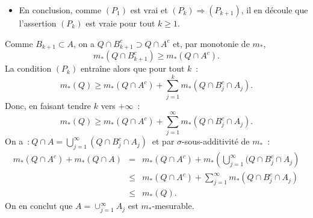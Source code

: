 {\begin{enumerate}
{\begin{itemize}
Supposons que l'assertion $(P_{k})$ soit v\'erifi\'ee, alors
$$
m_*(Q) = m_*(Q \cap B_{k+1}^c) + \sum _{j=1}^{k} m_*(Q \cap
B_{j}^c \cap A_j),
$$
et d'apr\`es \eqref{la}
\begin{eqnarray*} m_*(Q) &=& m_*(Q \cap B_{k+2}^{c})
+ m_*(Q\cap B_{k+1}^c \cap A_{k+1})+ \sum _{j=1}^{k} m_*(Q \cap
B_{j}^c \cap A_j) \\&=& m_*(Q \cap B_{k+2}^{c})+ \sum _{j=1}^{k+1}
m_*(Q \cap B_{j}^c \cap A_j),
\end{eqnarray*}
qui n'est autre que $(P_{k+1})$.
\item En conclusion, comme
$(P_1)$ est vrai et $(P_{k})\Rightarrow (P_{k+1})$, il en
d\'ecoule que l'assertion $(P_{k})$ est vraie pour tout $k\geq
1$.
\end{itemize}
Comme $B_{k+1} \subset A$, on a $Q \cap B_{k+1}^c \supset Q
\cap A^c$ et, par  monotonie de $m_*$, $$m_*(Q\cap B_{k+1}^c)
\geq m_*(Q \cap A^c).$$ La condition $(P_{k})$ entra\^ine alors
que pour tout $k$~:
$$
m_*(Q) \geq m_*(Q \cap A^c) + \sum_{j=1}^{k} m_*(Q\cap B_{j}^c
\cap A_j).
$$
Donc, en faisant tendre $k$ vers $+\infty$~:
$$
m_*(Q) \geq m_*(Q \cap A^c) + \sum_{j=1}^{\infty} m_*(Q\cap
B_{j}^c \cap A_j).
$$
On a~:$~Q\cap A = \bigcup_{j=1}^{\infty}(Q\cap B_{j}^c \cap
A_{j})~$ et par  $\sigma$-sous-additivit\'e de $m_*$~:
\begin{eqnarray*}
m_*(Q\cap A^c) + m_*(Q\cap A) &=&  m_*(Q\cap A^c) +
m_*\left(\bigcup_{j=1}^{\infty}(Q\cap B_{j}^c \cap A_j\right)\\
& \leq & m_*(Q\cap A^c) + \sum_{j=1}^{\infty} m_*(Q\cap B_{j}^c
\cap A_j)\\&\leq & m_*(Q).
\end{eqnarray*}
On en conclut que $A = \cup_{j=1}^{\infty} A_{j}$ est
$m_*$-mesurable.
}
\end{enumerate}
}
